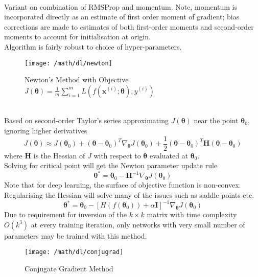 \begin{remark} \\
Variant on combination of RMSProp and momentum. Note, momentum is incorporated directly as an estimate of first order moment of gradient; bias corrections are made to estimates of both first-order moments and second-order moments to account for initialisation at origin.\\
Algorithm is fairly robust to choice of hyper-parameters.
\end{remark}

\begin{figure}[H]
\centering
\texttt{[image: /math/dl/newton]}
\caption{Newton's Method with Objective $J(\bm{\theta}) = \frac{1}{m} \sum_{i=1}^m L(f(\bm{x}^{(i)}; \bm{\theta}), y^{(i)})$}
\end{figure}

\begin{remark} \\
Based on second-order Taylor's series approximating $J(\bm{\theta})$ near the point $\bm{\theta}_0$, ignoring higher derivatives
\begin{equation}
J(\bm{\theta}) \approx J(\bm{\theta}_0) + (\bm{\theta} - \bm{\theta}_0)^T \nabla_{\bm{\theta}} J(\bm{\theta}_0) + \frac{1}{2} (\bm{\theta} - \bm{\theta}_0)^T \bm{H}(\bm{\theta} - \bm{\theta}_0) \nonumber
\end{equation}
where $\bm{H}$ is the Hessian of $J$ with respect to $\bm{\theta}$ evaluated at $\bm{\theta}_0$.\\
Solving for critical point will get the Newton parameter update rule
\begin{equation}
\bm{\theta}^{*} = \bm{\theta}_0 - \bm{H}^{-1} \nabla_{\bm{\theta}} J(\bm{\theta}_0) \nonumber
\end{equation}
Note that for deep learning, the surface of objective function is non-convex. Regularising the Hessian will solve many of the issues such as saddle points etc.
\begin{equation}
\bm{\theta}^{*} = \bm{\theta}_0 - [H(f(\bm{\theta}_0)) + \alpha \bm{I}]^{-1} \nabla_{\bm{\theta}} J(\bm{\theta}_0) \nonumber
\end{equation}
Due to requirement for inversion of the $k \times k$ matrix with time complexity $O(k^3)$ at every training iteration, only networks with very small number of parameters may be trained with this method.
\end{remark}

\begin{figure}[H]
\centering
\texttt{[image: /math/dl/conjugrad]}
\caption{Conjugate Gradient Method}
\end{figure}

